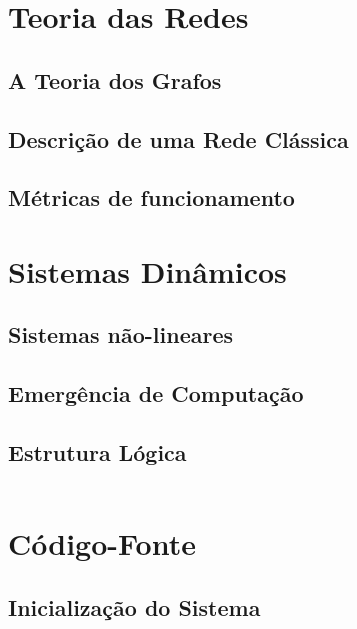 \documentclass[12pt,a4paper]{article}
\begin{document}
\section{Teoria das Redes}
\subsection{A Teoria dos Grafos}
\subsection{Descrição de uma Rede Clássica}
\subsection{Métricas de funcionamento}

\section{Sistemas Dinâmicos}
\subsection{Sistemas não-lineares}
\subsection{Emergência de Computação}






\subsection{Estrutura Lógica}

\begin{lstlisting}[style=ravenstyle, language=Python]


\end{lstlisting}


\section{Código-Fonte}

\subsection{Inicialização do Sistema}
\end{document}
